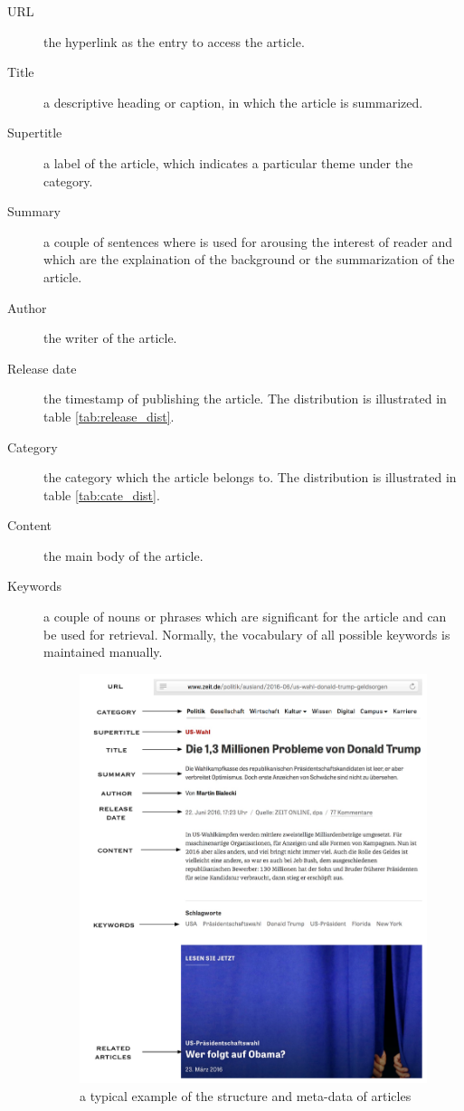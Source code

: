 \begin{description}
    \item[URL] the hyperlink as the entry to access the article.

    \item[Title] a descriptive heading or caption, in which the article is summarized.
    \item[Supertitle] a label of the article, which indicates a particular theme under the category.
    \item[Summary] a couple of sentences where is used for arousing the interest of reader and which are the explaination of the background or the summarization of the article. 
    \item[Author] the writer of the article.
    \item[Release date] the timestamp of publishing the article. The distribution is illustrated in table \ref{tab:release_dist}.
    \item[Category] the category which the article belongs to. The distribution is illustrated in table \ref{tab:cate_dist}.

    \item[Content] the main body of the article.
    
    \item[Keywords] a couple of nouns or phrases which are significant for the article and can be used for retrieval. Normally, the vocabulary of all possible keywords is maintained manually. 
    
    \begin{figure}[!htb]
    \centering
    \includegraphics[width=1\textwidth]{fig/article.pdf}
    \caption{a typical example of the structure and meta-data of articles}
    \label{fig:article_structure}
    \end{figure}
    

\end{description}
